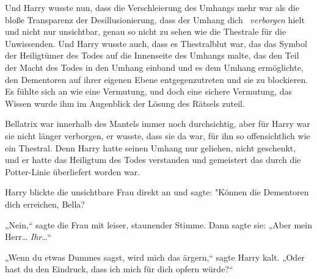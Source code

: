Und Harry wusste nun, dass die Verschleierung des Umhangs mehr war als die bloße Transparenz der Desillusionierung, dass der Umhang dich ~\emph{verborgen} hielt und nicht nur unsichtbar, genau so nicht zu sehen wie die Thestrale für die Unwissenden. Und Harry wusste auch, dass es Thestralblut war, das das Symbol der Heiligtümer des Todes auf die Innenseite des Umhangs malte, das den Teil der Macht des Todes in den Umhang einband und es dem Umhang ermöglichte, den Dementoren auf ihrer eigenen Ebene entgegenzutreten und sie zu blockieren. Es fühlte sich an wie eine Vermutung, und doch eine sichere Vermutung, das Wissen wurde ihm im Augenblick der Lösung des Rätsels zuteil.

Bellatrix war innerhalb des Mantels immer noch durchsichtig, aber für Harry war sie nicht länger verborgen, er wusste, dass sie da war, für ihn so offensichtlich wie ein Thestral. Denn Harry hatte seinen Umhang nur geliehen, nicht geschenkt, und er hatte das Heiligtum des Todes verstanden und gemeistert das durch die Potter-Linie überliefert worden war.

Harry blickte die unsichtbare Frau direkt an und sagte: "Können die Dementoren dich erreichen, Bella?

„Nein,“ sagte die Frau mit leiser, staunender Stimme. Dann sagte sie: „Aber mein Herr… \emph{Ihr}…“

„Wenn du etwas Dummes sagst, wird mich das ärgern,“ sagte Harry kalt. „Oder hast du den Eindruck, dass ich mich für dich opfern würde?“

